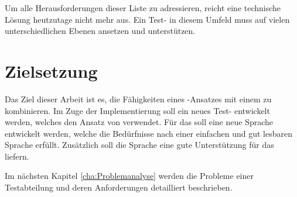 \SuperPar
Um alle Herausforderungen dieser Liste zu adressieren, reicht eine technische Lösung heutzutage nicht mehr aus. Ein Test- in diesem Umfeld muss auf vielen unterschiedlichen Ebenen ansetzen und unterstützen. 


\section{Zielsetzung}

Das Ziel dieser Arbeit ist es, die Fähigkeiten eines -Ansatzes mit einem   zu kombinieren. Im Zuge der Implementierung soll ein neues Test- entwickelt werden, welches den Ansatz von  verwendet. Für das  soll eine neue Sprache entwickelt werden, welche die Bedürfnisse nach einer einfachen und gut lesbaren Sprache erfüllt. Zusätzlich soll die Sprache eine gute Unterstützung für das  liefern.

\SuperPar
Im nächsten Kapitel \ref{cha:Problemanalyse} werden die Probleme einer Testabteilung und deren Anforderungen detailliert beschrieben.